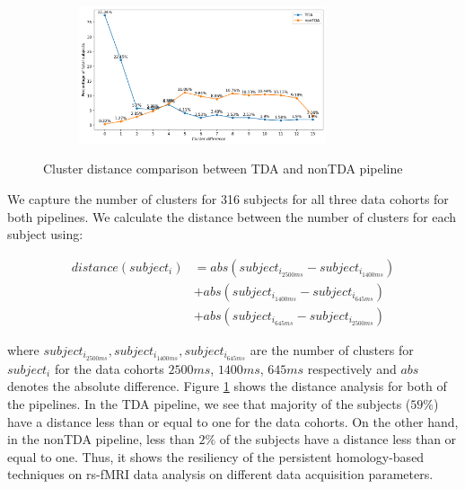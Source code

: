 \begin{figure}[!ht]%
	\centering
	\begin{subfigure}[!ht]{1\textwidth}
		\centering
		\hspace{8mm}
		\includegraphics[width=0.8\textwidth]{figures/tda_nontda.png}\hfill
	\end{subfigure}
	\caption{Cluster distance comparison between TDA and nonTDA pipeline}
	\label{fig:clus_distance}
\end{figure}

We capture the number of clusters for 316 subjects for all three data cohorts for both pipelines. We calculate the distance between the number of clusters for each subject using: 

\begin{align}
    distance(subject_i) &= abs(subject_{i_{2500ms}} - subject_{i_{1400ms}})   \nonumber\\
    &+ abs(subject_{i_{1400ms}} - subject_{i_{645ms}})   \nonumber \\ 
    &+ abs(subject_{i_{645ms}} - subject_{i_{2500ms}}) \label{eq:dis}
\end{align}

where $subject_{i_{2500ms}}, subject_{i_{1400ms}}, subject_{i_{645ms}}$ are the number of clusters for $subject_i$ for the data cohorts $2500ms$, $1400ms$, $645ms$ respectively and $abs$ denotes the absolute difference. 
Figure \ref{fig:clus_distance} shows the distance analysis for both of the pipelines. In the TDA pipeline, we see that majority of the subjects ($59\%$) have a distance less than or equal to one for the data cohorts. On the other hand, in the nonTDA pipeline, less than $2\%$ of the subjects have a distance less than or equal to one. Thus, it shows the resiliency of the persistent homology-based techniques on rs-fMRI data analysis on different data acquisition parameters.




